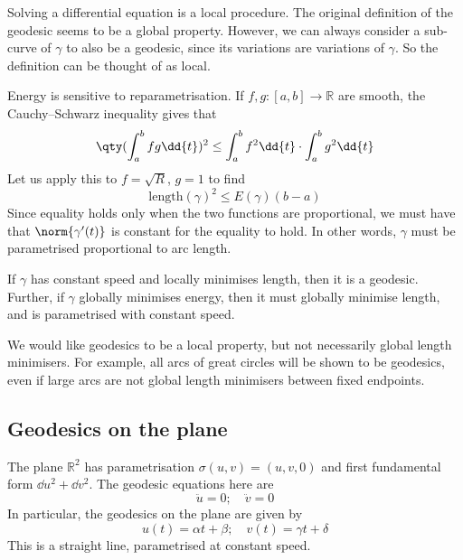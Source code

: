 \begin{remark}
	Solving a differential equation is a local procedure.
	The original definition of the geodesic seems to be a global property.
	However, we can always consider a sub-curve of \( \gamma \) to also be a geodesic, since its variations are variations of \( \gamma \).
	So the definition can be thought of as local.

	Energy is sensitive to reparametrisation.
	If \( f, g \colon [a,b] \to \mathbb R \) are smooth, the Cauchy--Schwarz inequality gives that
	\[
		\qty(\int_a^b fg \dd{t})^2 \leq \int_a^b f^2 \dd{t} \cdot \int_a^b g^2 \dd{t}
	\]
	Let us apply this to \( f = \sqrt{R} \), \( g = 1 \) to find
	\[
		\mathrm{length}(\gamma)^2 \leq E(\gamma)(b-a)
	\]
	Since equality holds only when the two functions are proportional, we must have that \( \norm{\gamma'(t)} \) is constant for the equality to hold.
	In other words, \( \gamma \) must be parametrised proportional to arc length.
\end{remark}
\begin{corollary}
	If \( \gamma \) has constant speed and locally minimises length, then it is a geodesic.
	Further, if \( \gamma \) globally minimises energy, then it must globally minimise length, and is parametrised with constant speed.
\end{corollary}
\begin{remark}
	We would like geodesics to be a local property, but not necessarily global length minimisers.
	For example, all arcs of great circles will be shown to be geodesics, even if large arcs are not global length minimisers between fixed endpoints.
\end{remark}

\subsection{Geodesics on the plane}
The plane \( \mathbb R^2 \) has parametrisation \( \sigma(u,v) = (u,v,0) \) and first fundamental form \( \dd{u}^2 + \dd{v}^2 \).
The geodesic equations here are
\[
	\ddot u = 0;\quad \ddot v = 0
\]
In particular, the geodesics on the plane are given by
\[
	u(t) = \alpha t + \beta;\quad v(t) = \gamma t + \delta
\]
This is a straight line, parametrised at constant speed.


